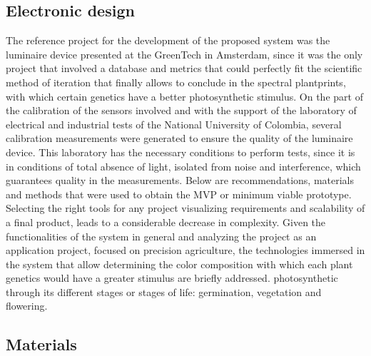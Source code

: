 \documentclass[letterpaper,12pt,twoside]{articleingud}
\begin{document}
\subsection{Electronic design}
The reference project for the development of the proposed system was the luminaire device presented at the GreenTech in Amsterdam, since it was the only project that involved a database and metrics that could perfectly fit the scientific method of iteration that finally allows to conclude in the spectral plantprints, with which certain genetics have a better photosynthetic stimulus.
On the part of the calibration of the sensors involved and with the support of the laboratory of electrical and industrial tests of the National University of Colombia, several calibration measurements were generated to ensure the quality of the luminaire device. This laboratory has the necessary conditions to perform tests, since it is in conditions of total absence of light, isolated from noise and interference, which guarantees quality in the measurements.
Below are recommendations, materials and methods that were used to obtain the MVP or minimum viable prototype.
Selecting the right tools for any project visualizing requirements and scalability of a final product, leads to a considerable decrease in complexity. Given the functionalities of the system in general and analyzing the project as an application project, focused on precision agriculture, the technologies immersed in the system that allow determining the color composition with which each plant genetics would have a greater stimulus are briefly addressed. photosynthetic through its different stages or stages of life: germination, vegetation and flowering.

\subsection{Materials}
\end{document}
